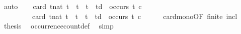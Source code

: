 \begin{isabellebody}
\ auto\isanewline
\ \ \isamarkupfalse%
\ {\isacartoucheopen}card\ {\isacharbraceleft}t{\isacharcolon}{\isacharcolon}nat{\isachardot}\ t\ {\isasymle}\ t\ {\isasymand}\ t\ {\isacharless}\ td\ {\isasymand}\ occurs\ t\ c{\isacharbraceright}\isanewline
\ \ \ \ \ \ \ \ {\isasymle}\ card\ {\isacharbraceleft}t{\isacharcolon}{\isacharcolon}nat{\isachardot}\ t\ {\isasymle}\ t\ {\isasymand}\ t\ {\isacharless}\ td{\isacharprime}\ {\isasymand}\ occurs\ t\ c{\isacharbraceright}{\isacartoucheclose}\isanewline
\ \ \ \ \isamarkupfalse%
\ card{\isacharunderscore}mono{\isacharbrackleft}OF\ finite\ incl{\isacharbrackright}\ \isacommand{{\isachardot}}\isamarkupfalse%
\isanewline
\ \ \isamarkupfalse%
\ {\isacharquery}thesis\ \isamarkupfalse%
\ occurrence{\isacharunderscore}count{\isacharunderscore}def\ \isamarkupfalse%
\ simp\isanewline
{}\isamarkupfalse%
%
\endisatagproof
{\isafoldproof}%
%
\isadelimproof
\isanewline
%
\endisadelimproof
%
\isadelimtheory
\isanewline
%
\endisadelimtheory
%
\isatagtheory
{}\isamarkupfalse%
%
\endisatagtheory
{\isafoldtheory}%
%
\isadelimtheory
%
\endisadelimtheory
%
\end{isabellebody}%
\endinput
